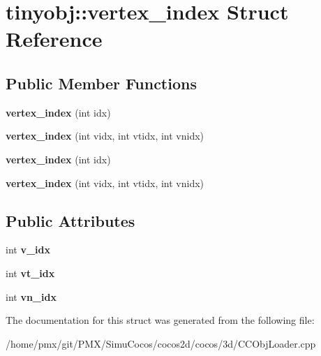 \hypertarget{structtinyobj_1_1vertex__index}{}\section{tinyobj\+:\+:vertex\+\_\+index Struct Reference}
\label{structtinyobj_1_1vertex__index}
\subsection*{Public Member Functions}
\begin{DoxyCompactItemize}
\item 
\mbox{\label{structtinyobj_1_1vertex__index_a894075fa64d32082219c138f111e4753}} 
{\bfseries vertex\+\_\+index} (int idx)
\item 
\mbox{\label{structtinyobj_1_1vertex__index_aa3c4d6bcba36c2abb06e25497a1376a1}} 
{\bfseries vertex\+\_\+index} (int vidx, int vtidx, int vnidx)
\item 
\mbox{\label{structtinyobj_1_1vertex__index_a894075fa64d32082219c138f111e4753}} 
{\bfseries vertex\+\_\+index} (int idx)
\item 
\mbox{\label{structtinyobj_1_1vertex__index_aa3c4d6bcba36c2abb06e25497a1376a1}} 
{\bfseries vertex\+\_\+index} (int vidx, int vtidx, int vnidx)
\end{DoxyCompactItemize}
\subsection*{Public Attributes}
\begin{DoxyCompactItemize}
\item 
\mbox{\label{structtinyobj_1_1vertex__index_a91a2616fb97e0da915a40654edf9b558}} 
int {\bfseries v\+\_\+idx}
\item 
\mbox{\label{structtinyobj_1_1vertex__index_aae7e058d3aa0993aa05e95d82dd6b8bf}} 
int {\bfseries vt\+\_\+idx}
\item 
\mbox{\label{structtinyobj_1_1vertex__index_a30f2a63a5ed20cc3ad64e340c4020da8}} 
int {\bfseries vn\+\_\+idx}
\end{DoxyCompactItemize}


The documentation for this struct was generated from the following file\+:\begin{DoxyCompactItemize}
\item 
/home/pmx/git/\+P\+M\+X/\+Simu\+Cocos/cocos2d/cocos/3d/C\+C\+Obj\+Loader.\+cpp\end{DoxyCompactItemize}
